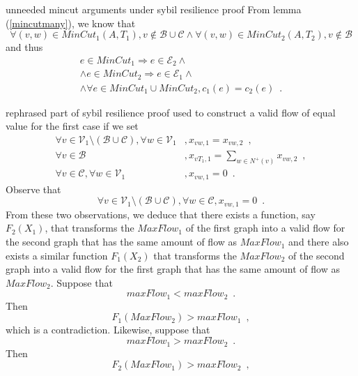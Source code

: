unneeded mincut arguments under sybil resilience proof
       From lemma (\ref{mincutmany}), we know that
       \begin{equation}
          \forall \left(v, w\right) \in MinCut_1\left(A, T_1\right), v \notin \mathcal{B} \cup \mathcal{C} \wedge \forall
          \left(v, w\right) \in MinCut_2\left(A, T_2\right), v \notin \mathcal{B}
       \end{equation}
       and thus
       \begin{equation}
       \begin{gathered}
          e \in MinCut_1 \Rightarrow e \in \mathcal{E}_2 \wedge \\
          \wedge e \in MinCut_2 \Rightarrow e \in \mathcal{E}_1 \wedge \\
          \wedge \forall e \in MinCut_1 \cup MinCut_2, c_1(e) = c_2(e) \enspace.
       \end{gathered}
       \end{equation}

rephrased part of sybil resilience proof
       used to construct a valid flow of equal value for the first case if we set
       \begin{align}
          \forall v \in \mathcal{V}_1 \setminus \left(\mathcal{B} \cup \mathcal{C}\right), \forall w \in \mathcal{V}_1&,
          x_{vw,1} = x_{vw,2} \enspace, \\
          \forall v \in \mathcal{B}&, x_{vT_1,1} = \sum\limits_{w \in N^{+}(v)}x_{vw,2} \enspace, \\
          \forall v \in \mathcal{C}, \forall w \in \mathcal{V}_1&, x_{vw,1} = 0 \enspace.
       \end{align}
       Observe that
       \begin{equation}
          \forall v \in \mathcal{V}_1 \setminus \left(\mathcal{B} \cup \mathcal{C}\right), \forall w \in \mathcal{C},
          x_{vw, 1} = 0 \enspace.
       \end{equation}
       From these two observations, we deduce that there exists a function, say $F_2(X_1)$, that transforms
       the $MaxFlow_1$ of the first graph into a valid flow for the second graph that has the same amount of flow as
       $MaxFlow_1$ and there also exists a similar function $F_1(X_2)$ that transforms the $MaxFlow_2$ of the second graph
       into a valid flow for the first graph that has the same amount of flow as $MaxFlow_2$. Suppose that
       \begin{equation}
         maxFlow_1 < maxFlow_2 \enspace.
       \end{equation}
       Then
       \begin{equation}
          F_1(MaxFlow_2) > maxFlow_1 \enspace,
       \end{equation}
       which is a contradiction. Likewise, suppose that
       \begin{equation}
          maxFlow_1 > maxFlow_2 \enspace.
       \end{equation}
       Then
       \begin{equation}
          F_2(MaxFlow_1) > maxFlow_2 \enspace,
       \end{equation}

